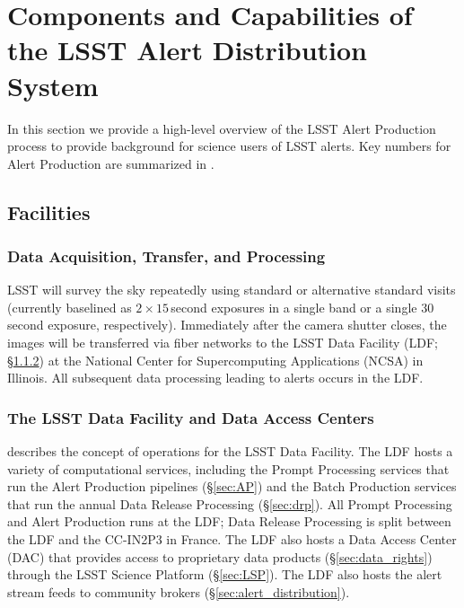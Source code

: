 \section{Components and Capabilities of the LSST Alert Distribution System}\label{sec:components}

In this section we provide a high-level overview of the LSST Alert Production process to provide background for science users of LSST alerts.
Key numbers for Alert Production are summarized in .

\subsection{Facilities}

\subsubsection{Data Acquisition, Transfer, and Processing}

LSST will survey the sky repeatedly using standard or alternative standard visits (currently baselined as $2\times15$\,second exposures in a single band or a single 30\,second exposure, respectively).
Immediately after the camera shutter closes, the images will be transferred via fiber networks to the LSST Data Facility (LDF; \S \ref{sec:LDF}) at the National Center for Supercomputing Applications (NCSA) in Illinois.
All subsequent data processing leading to alerts occurs in the LDF.

\subsubsection{The LSST Data Facility and Data Access Centers} \label{sec:LDF}

 describes the concept of operations for the LSST Data Facility.
The LDF hosts a variety of computational services, including the Prompt Processing services that run the Alert Production pipelines (\S \ref{sec:AP}) and the Batch Production services that run the annual Data Release Processing (\S \ref{sec:drp}).
All Prompt Processing and Alert Production runs at the LDF;
Data Release Processing is split between the LDF and the CC-IN2P3 in France.
The LDF also hosts a Data Access Center (DAC) that provides access to proprietary data products (\S \ref{sec:data_rights}) through the LSST Science Platform (\S \ref{sec:LSP}).
The LDF also hosts the alert stream feeds to community brokers (\S \ref{sec:alert_distribution}).

